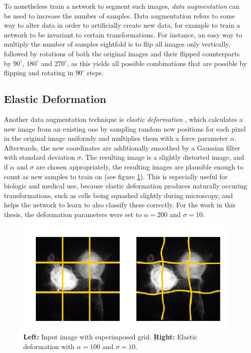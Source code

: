 To nonetheless train a network to segment such images, \textit{data augmentation} can be used to increase the number of samples. Data augmentation refers to some way to alter data in order to artificially create new data, for example to train a network to be invariant to certain transformations. For instance, an easy way to multiply the number of samples eightfold is to flip all images only vertically, followed by rotations of both the original images and their flipped counterparts by $90^{\circ}$, $180^{\circ}$ and $270^{\circ}$, as this yields all possible combinations that are possible by flipping and rotating in $90^{\circ}$ steps.


		\subsection{Elastic Deformation}
Another data augmentation technique is \textit{elastic deformation} \cite{elastic}, which calculates a new image from an existing one by sampling random new positions for each pixel in the original image uniformly and multiplies them with a force parameter $\alpha$. Afterwards, the new coordinates are additionally smoothed by a Gaussian filter with standard deviation $\sigma$. The resulting image is a slightly distorted image, and if $\alpha$ and $\sigma$ are chosen appropriately, the resulting images are plausible enough to count as new samples to train on (see figure \ref{fig:elastic}). This is especially useful for biologic and medical use, because elastic deformation produces naturally occuring transformations, such as cells being squashed slightly during microscopy, and helps the network to learn to also classify these correctly. For the work in this thesis, the deformation parameters were set to $\alpha = 200$ and $\sigma = 10$.


\begin {figure}[!ht]
	\begin{center}
		\includegraphics[scale=0.80]{img/fig_elastic.png}
	\end{center}
	\caption[]{\textbf{Left:} Input image with superimposed grid. \textbf{Right:} Elastic deformation with $\alpha = 100$ and $\sigma = 10$.}
	\label{fig:elastic}
\end {figure}

